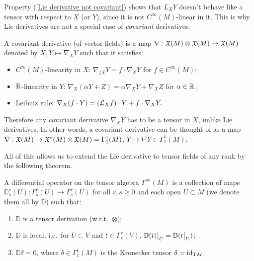 \begin{rem}\label{rem: Lie derivatives not covariant}
    Property (\ref{Lie derivative not covariant}) shows that $L_X Y$ doesn't behave like a tensor with respect to $X$ (or $Y$), since it is not $C^\infty(M)$-linear in it. This is why Lie derivatives are not a special case of \emph{covariant} derivatives.
    
    A covariant derivative (of vector fields) is a map $\nabla:\mathfrak{X}(M)\otimes\mathfrak{X}(M)\to \mathfrak{X}(M)$ denoted by $X,Y\mapsto \nabla_X Y$ such that it satisfies:
    \begin{itemize}
        \item $C^\infty(M)$-linearity in $X$: $\nabla_{fX}Y=f\cdot \nabla_X Y$ for $f\in C^\infty(M)$;
        \item $\mathbb{R} $-linearity in $Y$: $\nabla_X (\alpha Y+Z)=\alpha \nabla_XY+\nabla_XZ$ for $\alpha\in\mathbb{R} $;
        \item Leibniz rule: $\nabla_X(f\cdot Y)=(\mathcal{L}_X f)\cdot Y+f\cdot \nabla_X Y.$
    \end{itemize}
    Therefore any covariant derivative $\nabla_X Y$ has to be a tensor in $X$, unlike Lie derivatives. In other words, a covariant derivative can be thought of as a map $\nabla:\mathfrak{X}(M)\to \mathfrak{X}^\ast(M)\otimes\mathfrak{X}(M)=\Gamma^1_1(M)$, $Y\mapsto \nabla Y\in\Gamma^1_1(M)$.
\end{rem}

All of this allows us to extend the Lie derivative to tensor fields of any rank by the following theorem.

\begin{defn}
A differential operator on the tensor algebra $\Gamma^\infty(M)$ is a collection of maps $\mathbb{D}^r_s(U):\Gamma^r_s(U)\to \Gamma^r_s(U)$ for all $r,s\geq 0$ and each open $U\mathring{\subset}M$ (we denote them all by $\mathbb{D}$) such that:
\begin{enumerate}
    \item $\mathbb{D}$ is a tensor derivation (w.r.t.\ $\otimes$);
    \item $\mathbb{D}$ is local, i.e.\ for $U\subset V$ and $t\in\Gamma^r_s(V)$, $\restr{\mathbb{D}(t)}{U}=\mathbb{D}(\restr{t}{U})$;
    \item $\mathbb{D} \delta=0$, where $\delta\in\Gamma^1_1(M)$ is the Kronecker tensor $\delta=\operatorname{id}_{\mathrm{T} M}$.
\end{enumerate}
\end{defn}

